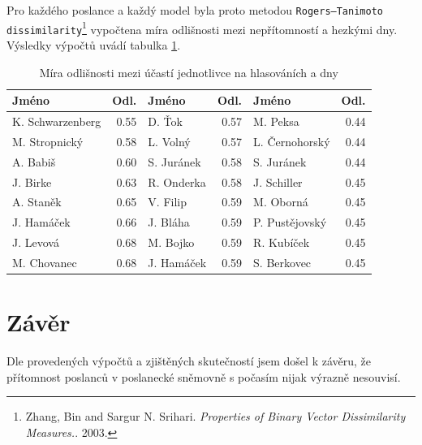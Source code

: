\documentclass[12pt]{report}
\begin{document}
Pro každého poslance a každý model byla proto metodou \texttt{Rogers–Tanimoto dissimilarity}\footnote{Zhang, Bin and Sargur N. Srihari. \emph{Properties of Binary Vector Dissimilarity Measures.}. 2003.} vypočtena míra odlišnosti mezi nepřítomností a hezkými dny. Výsledky výpočtů uvádí tabulka \ref{tbl:dis}.

\begin{table}[h!]
    \centering
    \begin{tabular}{lr|lr|lr}
                \hline
                Jméno & Odl. & Jméno & Odl. & Jméno & Odl. \\
                \hline
                K. Schwarzenberg &  0.55 & D. Ťok &  0.57 & M. Peksa      &  0.44 \\
                M. Stropnický   &  0.58 & L. Volný     &  0.57 & L. Černohorský  &  0.44 \\
                A. Babiš        &  0.60 & S. Juránek &  0.58 & S. Juránek  &  0.44 \\
                J. Birke           &  0.63 & R. Onderka     &  0.58 & J. Schiller       &  0.45 \\
                A. Staněk      &  0.65 & V. Filip     &  0.59 & M. Oborná      &  0.45 \\
                J. Hamáček         &  0.66 & J. Bláha        &  0.59 & P. Pustějovský  &  0.45 \\
                J. Levová         &  0.68 & M. Bojko      &  0.59 & R. Kubíček      &  0.45 \\
                M. Chovanec      &  0.68 & J. Hamáček       &  0.59 & S. Berkovec &  0.45
            \end{tabular}
    \caption{Míra odlišnosti mezi účastí jednotlivce na hlasováních a  dny}
    \label{tbl:dis}
\end{table}

\section{Závěr}

Dle provedených výpočtů a zjištěných skutečností jsem došel k závěru, že přítomnost poslanců v poslanecké sněmovně s počasím nijak výrazně nesouvisí.
\end{document}
